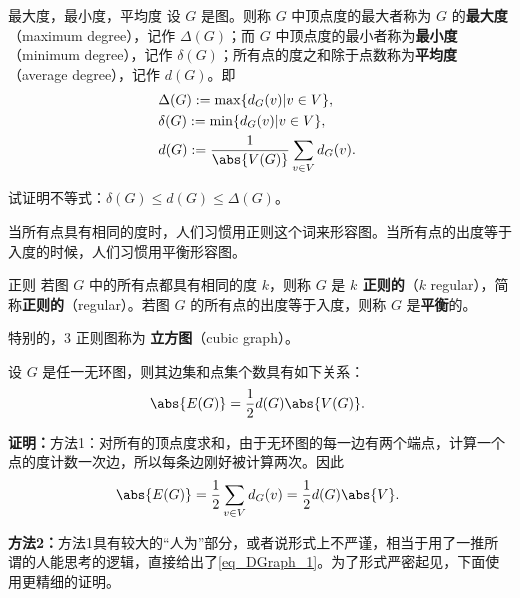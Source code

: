 \begin{definition}{最大度，最小度，平均度}
设 $G$ 是图。则称 $G$ 中顶点度的最大者称为 $G$ 的\textbf{最大度}（maximum degree），记作 $\Delta(G)$；而 $G$ 中顶点度的最小者称为\textbf{最小度}（minimum degree），记作 $\delta(G)$；所有点的度之和除于点数称为\textbf{平均度}（average degree），记作 $d(G)$。即
\begin{equation}\label{eq_DGraph_2}
\begin{aligned}
&\Delta(G):=\max\{d_G(v)|v\in V\}, \\
&\delta(G):=\min\{d_G(v)|v\in V\},\\
&d(G):=\frac{1}{\abs{V(G)}}\sum_{v\in V}d_G(v).
\end{aligned}~
\end{equation}
\end{definition}

\begin{exercise}{}
试证明不等式：$\delta(G)\leq d(G)\leq \Delta(G)$。
\end{exercise}


当所有点具有相同的度时，人们习惯用正则这个词来形容图。当所有点的出度等于入度的时候，人们习惯用平衡形容图。
\begin{definition}{正则}
若图 $G$ 中的所有点都具有相同的度 $k$，则称 $G$ 是 \textbf{$k$ 正则的}（$k$ regular），简称\textbf{正则的}（regular）。若图 $G$ 的所有点的出度等于入度，则称 $G$ 是\textbf{平衡}的。

特别的，$3$ 正则图称为 \textbf{立方图}（cubic graph）。
\end{definition}

\begin{theorem}{}\label{the_DGraph_1}
设 $G$ 是任一无环图，则其边集和点集个数具有如下关系：
\begin{equation}\label{eq_DGraph_3}
\abs{E(G)}=\frac{1}{2}d(G)\abs{V(G)}.~
\end{equation}
\end{theorem}
\textbf{证明：}方法1：对所有的顶点度求和，由于无环图的每一边有两个端点，计算一个点的度计数一次边，所以每条边刚好被计算两次。因此
\begin{equation}\label{eq_DGraph_1}
\abs{E(G)}=\frac{1}{2}\sum_{v\in V}d_G(v)=\frac{1}{2}d(G)\abs{V}.~
\end{equation}

\textbf{方法2：}方法1具有较大的“人为”部分，或者说形式上不严谨，相当于用了一推所谓的人能思考的逻辑，直接给出了\autoref{eq_DGraph_1}。为了形式严密起见，下面使用更精细的证明。

